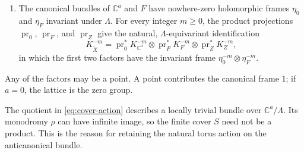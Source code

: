\begin{theorem}
\begin{enumerate}
\item The canonical bundles of $\mathbb C^a$ and $F$ have nowhere-zero
holomorphic frames $\eta_0$ and $\eta_F$ invariant under $\Lambda$.
For every integer $m\geq0$, the product projections
$\operatorname{pr}_0$, $\operatorname{pr}_F$, and $\operatorname{pr}_Z$
give the natural, $\Lambda$-equivariant identification
\begin{equation}\label{eq:cover-canonical}
 K_{\widetilde X}^{-m}
 =\operatorname{pr}_0^*K_{\mathbb C^a}^{-m}
   \otimes\operatorname{pr}_F^*K_F^{-m}
   \otimes\operatorname{pr}_Z^*K_Z^{-m},
\end{equation}
in which the first two factors have the invariant frame
$\eta_0^{-m}\otimes\eta_F^{-m}$.
\end{enumerate}
Any of the factors may be a point.  A point contributes the canonical
frame $1$; if $a=0$, the lattice is the zero group.
\end{theorem}

The quotient in \eqref{eq:cover-action} describes a locally trivial
bundle over $\mathbb C^a/\Lambda$.  Its monodromy $\rho$ can have infinite
image, so the finite cover $S$ need not be a product.  This is the reason
for retaining the natural torus action on the anticanonical bundle.

